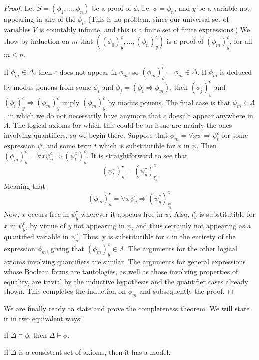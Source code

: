 \begin{proof}
    Let $S = (\phi_1,...,\phi_n)$ be a proof of $\phi$, i.e. $\phi = \phi_n$, and $y$ be a variable not appearing in any of the $\phi_i$. (This is no problem, since our universal set of variables $V$ is countably infinite, and this is a finite set of finite expressions.) We show by induction on $m$ that $((\phi_0)_y^c,...,(\phi_n)_y^c)$ is a proof of $(\phi_m)_y^c$, for all $m \leq n$.
    \par If $\phi_m \in \Delta$, then $c$ does not appear in $\phi_m$, so $(\phi_m)_y^c = \phi_m \in \Delta$. If $\phi_m$ is deduced by modus ponens from some $\phi_i$ and $\phi_j = (\phi_i \Rightarrow \phi_m)$, then $(\phi_j)_y^c$ and $(\phi_i)_y^c \Rightarrow (\phi_m)_y^c$ imply $(\phi_m)_y^c$ by modus ponens. The final case is that $\phi_m \in \Lambda$, in which we do not necessarily have anymore that $c$ doesn't appear anywhere in $\Lambda$. The logical axioms for which this could be an issue are mainly the ones involving quantifiers, so we begin there. Suppose that $\phi_m = \forall x \psi \Rightarrow \psi_t^c$ for some expression $\psi$, and some term $t$ which is substitutible for $x$ in $\psi$. Then $(\phi_m)_y^c = \forall x \psi_y^c \Rightarrow (\psi_t^x)_y^c$. It is straightforward to see that 
    \[ (\psi_t^x)_y^c = (\psi_y^c)_{t_y^c}^x \]
    Meaning that
    \[ (\phi_m)_y^c = \forall x \psi_y^c \Rightarrow (\psi_y^c)_{t_y^c}^x \]
    Now, $x$ occurs free in $\psi_y^c$ wherever it appears free in $\psi$. Also, $t_y^c$ is substitutible for $x$ in $\psi_y^c$, by virtue of $y$ not appearing in $\psi$, and thus certainly not appearing as a quantified variable in $\psi_y^c$. Thus, y is substitutible for $c$ in the entirety of the expression $\phi_m$, giving that $(\phi_m)_y^c \in \Lambda$. The arguments for the other logical axioms involving quantifiers are similar. The arguments for general expressions whose Boolean forms are tautologies, as well as those involving properties of equality, are trivial by the inductive hypothesis and the quantifier cases already shown. This completes the induction on $\phi_m$ and subsequently the proof.
\end{proof}
We are finally ready to state and prove the completeness theorem. We will state it in two equivalent ways:
\begin{theorem}
    If $\Delta \models \phi$, then $\Delta \vdash \phi$.
\end{theorem}
\begin{theorem}
    If $\Delta$ is a consistent set of axioms, then it has a model.
\end{theorem}
